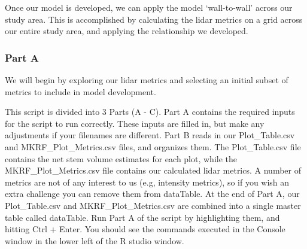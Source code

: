 \documentclass[
]{book}
\newenvironment{Shaded}{\begin{snugshade}}{\end{snugshade}}
\newcommand{\CommentTok}[1]{\textcolor[rgb]{0.56,0.35,0.01}{\textit{#1}}}
\newcommand{\DecValTok}[1]{\textcolor[rgb]{0.00,0.00,0.81}{#1}}
\newcommand{\FunctionTok}[1]{\textcolor[rgb]{0.13,0.29,0.53}{\textbf{#1}}}
\newcommand{\NormalTok}[1]{#1}
\newcommand{\OtherTok}[1]{\textcolor[rgb]{0.56,0.35,0.01}{#1}}
\newcommand{\SpecialCharTok}[1]{\textcolor[rgb]{0.81,0.36,0.00}{\textbf{#1}}}
\newcommand{\StringTok}[1]{\textcolor[rgb]{0.31,0.60,0.02}{#1}}
\begin{document}
Once our model is developed, we can apply the model `wall-to-wall' across our study area. This is accomplished by calculating the lidar metrics on a grid across our entire study area, and applying the relationship we developed.

\hypertarget{part-a}{%
\subsubsection*{Part A}\label{part-a}}

We will begin by exploring our lidar metrics and selecting an initial subset of metrics to include in model development.

\begin{Shaded}
\end{Shaded}

This script is divided into 3 Parts (A - C). Part A contains the required inputs for the script to run correctly. These inputs are filled in, but make any adjustments if your filenames are different. Part B reads in our Plot\_Table.csv and MKRF\_Plot\_Metrics.csv files, and organizes them. The Plot\_Table.csv file contains the net stem volume estimates for each plot, while the MKRF\_Plot\_Metrics.csv file contains our calculated lidar metrics. A number of metrics are not of any interest to us (e.g, intensity metrics), so if you wish an extra challenge you can remove them from dataTable. At the end of Part A, our Plot\_Table.csv and MKRF\_Plot\_Metrics.csv are combined into a single master table called dataTable. Run Part A of the script by highlighting them, and hitting Ctrl + Enter. You should see the commands executed in the Console window in the lower left of the R studio window.
\end{document}
